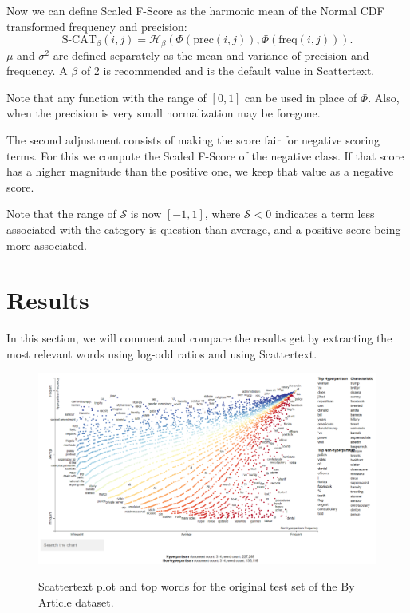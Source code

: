 \documentclass[11pt,a4paper]{article}
\begin{document}
Now we can define Scaled F-Score as the harmonic mean of the Normal CDF transformed frequency and precision:
$$ \mbox{S-CAT}_{\beta}(i, j) = \mathcal{H}_{\beta}(\Phi(\mbox{prec}(i, j)), \Phi(\mbox{freq}(i, j))).$$
$\mu$ and $\sigma^2$ are defined separately as the mean and variance of precision and frequency.
A $\beta$ of 2 is recommended and is the default value in Scattertext.

Note that any function with the range of $[0,1]$ can be used in place of $\Phi$.  Also, when the precision is very small normalization may be foregone.

The second adjustment consists of making the score fair for negative scoring terms. For this we compute the Scaled F-Score of the negative class. If that score has a higher magnitude than the positive one, we keep that value as a negative score.

Note that the range of $\mathcal{S}$ is now $[-1, 1]$, where $\mathcal{S} < 0$ indicates a term less associated with the category is question than average, and a positive score being more associated.

\section{Results}

In this section, we will comment and compare the results get by extracting the most relevant words using log-odd ratios and using Scattertext.

\begin{figure}[ht]
    \centering
    \href{https://juletx.github.io/hyperpartisan-news-detection/by_article_test.html}{\includegraphics[width=\linewidth]{byarticle_test.png}}
    \caption{Scattertext plot and top words for the original test set of the By Article dataset.}
    \label{fig:byarticle_test}
\end{figure}
\end{document}
